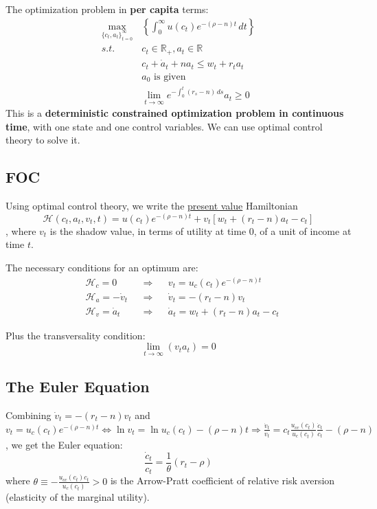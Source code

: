 The optimization problem in \textbf{per capita} terms:
\begin{align*}
    \max_{\{c_t,a_t\}_{t=0}^{\infty}} & \left\{\int_{0}^{\infty } u(c_t)e^{-(\rho-n)t} \, dt \right\}  \\
    s.t. \qquad                       & c_t \in \mathbb{R}_+, a_t \in \mathbb{R}                       \\
                                      & c_t + \dot{a}_t + na_t \leq w_t + r_ta_t                       \\
                                      & a_0 \text{ is given}                                           \\
                                      & \lim_{t \to \infty} e^{-\int_{0}^{t} (r_s-n) \, ds} a_t \geq 0
\end{align*}
This is a \textbf{deterministic constrained optimization problem in continuous time}, with one state and one control variables. We can use optimal control theory to solve it.

\subsection{FOC}

Using optimal control theory, we write the \underline{present value} Hamiltonian \[
    \mathcal{H}(c_t, a_t,v_t,t) = u(c_t)e^{-(\rho-n)t}+v_t[w_t+(r_t-n)a_t - c_t]
\], where $v_t$ is the shadow value, in terms of utility at time $0$, of a unit of income at time $t$.

The necessary conditions for an optimum are: \begin{align*}
     & \mathcal{H}_c = 0          &  & \Longrightarrow &  & v_t = u_c(c_t)e^{-(\rho-n)t}     \\
     & \mathcal{H}_a = -\dot{v}_t &  & \Longrightarrow &  & \dot{v}_t = -(r_t - n)v_t        \\
     & \mathcal{H}_v = \dot{a}_t  &  & \Longrightarrow &  & \dot{a}_t=w_t + (r_t-n)a_t - c_t
\end{align*}

Plus the transversality condition: \[
    \lim_{t \to \infty} (v_ta_t) = 0
\]

\subsection{The Euler Equation} Combining $\dot{v}_t = -(r_t - n)v_t$ and $v_t = u_c(c_t)e^{-(\rho-n)t} \iff \ln v_t = \ln u_c(c_t) - (\rho - n)t \Longrightarrow \frac{\dot{v}_t}{v_t} = c_t \frac{u_{cc}(c_t)}{u_c(c_t)}\frac{\dot{c}_t}{c_t} - (\rho - n)$, we get the Euler equation: \[
    \frac{\dot{c}_t}{c_t} = \frac{1}{\theta}(r_t - \rho)
\]
where $\theta \equiv -\frac{u_{cc}(c_t)c_t}{u_c(c_t)} > 0$ is the Arrow-Pratt coefficient of relative risk aversion (elasticity of the marginal utility).

